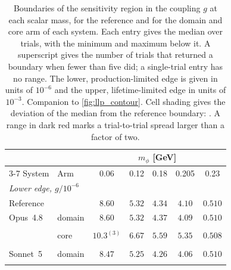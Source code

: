\begin{table}[H]
\centering
\small
\setlength{\tabcolsep}{4pt}
\caption{Boundaries of the sensitivity region in the coupling $g$ at each scalar mass, for the reference and for the domain and core arm of each system. Each entry gives the median over trials, with the minimum and maximum below it. A superscript gives the number of trials that returned a boundary when fewer than five did; a single-trial entry has no range. The lower, production-limited edge is given in units of $10^{-6}$ and the upper, lifetime-limited edge in units of $10^{-3}$. Companion to \cref{fig:llp_contour}. Cell shading gives the deviation of the median from the reference boundary: \protect\llpkey. A range in dark red marks a trial-to-trial spread larger than a factor of two.}
\label{tab:llp_contour}
\begin{tabular}{ll*{5}{c}}
\toprule
& & \multicolumn{5}{c}{$m_\phi$ [GeV]} \\
\cmidrule(lr){3-7}
System & Arm & 0.06 & 0.12 & 0.18 & 0.205 & 0.23 \\
\midrule
\multicolumn{7}{l}{\textit{Lower edge, $g/10^{-6}$}} \\
\midrule
\multicolumn{2}{l}{Reference} & $8.60$ & $5.32$ & $4.34$ & $4.10$ & $0.510$ \\[2pt]
Opus~4.8 & domain & \cellcolor{llpA}$8.60$ & \cellcolor{llpA}$5.32$ & \cellcolor{llpA}$4.37$ & \cellcolor{llpA}$4.09$ & \cellcolor{llpA}$0.510$ \\
& & \cellcolor{llpA}{\scriptsize$[8.55,\,10.6]$} & \cellcolor{llpA}{\scriptsize$[5.30,\,7.01]$} & \cellcolor{llpA}{\scriptsize$[4.33,\,5.91]$} & \cellcolor{llpA}{\scriptsize$[4.08,\,5.65]$} & \cellcolor{llpA}{\scriptsize$[0.510,\,0.511]$} \\[2pt]
 & core & \cellcolor{llpC}$10.3^{(3)}$ & \cellcolor{llpC}$6.67$ & \cellcolor{llpC}$5.59$ & \cellcolor{llpC}$5.35$ & \cellcolor{llpA}$0.508$ \\
& & \cellcolor{llpC}{\color{llpSpread}{\scriptsize$[5.40,\,11.7]$}} & \cellcolor{llpC}{\color{llpSpread}{\scriptsize$[3.54,\,7.57]$}} & \cellcolor{llpC}{\color{llpSpread}{\scriptsize$[2.97,\,6.46]$}} & \cellcolor{llpC}{\color{llpSpread}{\scriptsize$[2.85,\,6.07]$}} & \cellcolor{llpA}{\color{llpSpread}{\scriptsize$[0.235,\,0.597]$}} \\[2pt]
Sonnet~5 & domain & \cellcolor{llpA}$8.47$ & \cellcolor{llpA}$5.25$ & \cellcolor{llpA}$4.26$ & \cellcolor{llpA}$4.06$ & \cellcolor{llpA}$0.510$ \\
& & \cellcolor{llpA}{\scriptsize$[7.54,\,8.58]$} & \cellcolor{llpA}{\scriptsize$[5.02,\,5.34]$} & \cellcolor{llpA}{\scriptsize$[3.73,\,4.35]$} & \cellcolor{llpA}{\scriptsize$[3.54,\,4.08]$} & \cellcolor{llpA}{\scriptsize$[0.484,\,0.510]$} \\[2pt]

\end{tabular}
\end{table}
